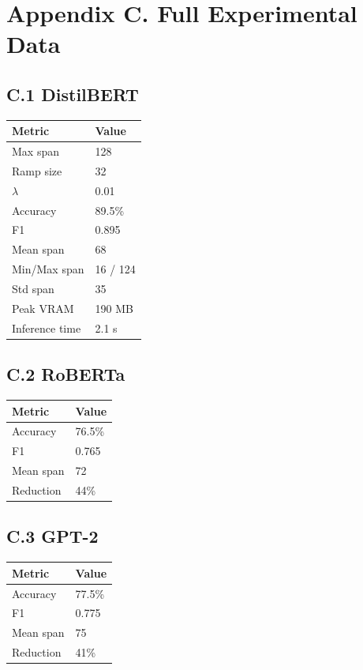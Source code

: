 
\section{Appendix C. Full Experimental Data}

\subsection{C.1 DistilBERT}

\begin{table}[H]
\centering
\small
\begin{tabular}{ll}
\toprule
\textbf{Metric} & \textbf{Value} \\
\midrule
Max span & 128 \\
Ramp size & 32 \\
$\lambda$ & 0.01 \\
Accuracy & 89.5\% \\
F1 & 0.895 \\
Mean span & 68 \\
Min/Max span & 16 / 124 \\
Std span & 35 \\
Peak VRAM & 190 MB \\
Inference time & 2.1 s \\
\bottomrule
\end{tabular}
\end{table}

\subsection{C.2 RoBERTa}

\begin{table}[H]
\centering
\small
\begin{tabular}{ll}
\toprule
\textbf{Metric} & \textbf{Value} \\
\midrule
Accuracy & 76.5\% \\
F1 & 0.765 \\
Mean span & 72 \\
Reduction & 44\% \\
\bottomrule
\end{tabular}
\end{table}

\subsection{C.3 GPT-2}

\begin{table}[H]
\centering
\small
\begin{tabular}{ll}
\toprule
\textbf{Metric} & \textbf{Value} \\
\midrule
Accuracy & 77.5\% \\
F1 & 0.775 \\
Mean span & 75 \\
Reduction & 41\% \\
\bottomrule
\end{tabular}
\end{table}

